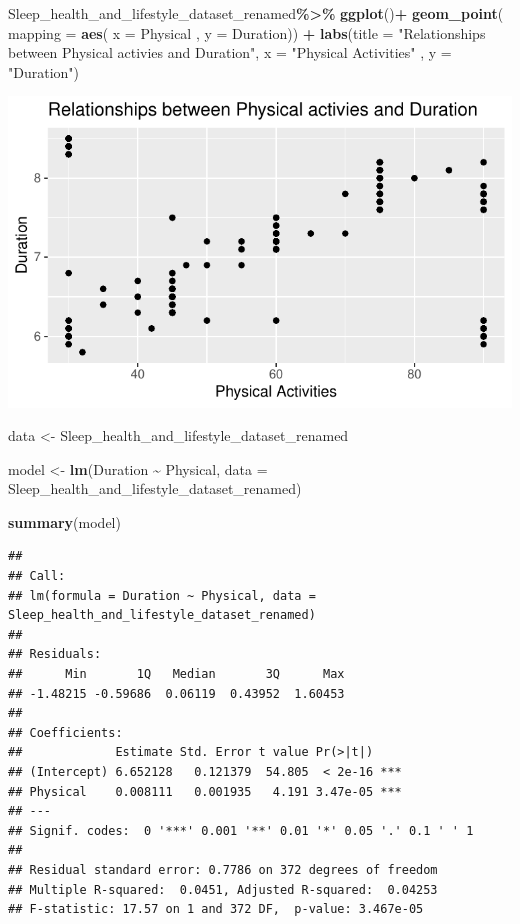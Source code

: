 \documentclass[
  11pt,
]{article}
\newenvironment{Shaded}{\begin{snugshade}}{\end{snugshade}}
\newcommand{\AttributeTok}[1]{\textcolor[rgb]{0.13,0.29,0.53}{#1}}
\newcommand{\FunctionTok}[1]{\textcolor[rgb]{0.13,0.29,0.53}{\textbf{#1}}}
\newcommand{\NormalTok}[1]{#1}
\newcommand{\OtherTok}[1]{\textcolor[rgb]{0.56,0.35,0.01}{#1}}
\newcommand{\SpecialCharTok}[1]{\textcolor[rgb]{0.81,0.36,0.00}{\textbf{#1}}}
\newcommand{\StringTok}[1]{\textcolor[rgb]{0.31,0.60,0.02}{#1}}
\begin{document}
\begin{Shaded}
\begin{Highlighting}[]
\NormalTok{Sleep\_health\_and\_lifestyle\_dataset\_renamed}\SpecialCharTok{\%\textgreater{}\%}
  \FunctionTok{ggplot}\NormalTok{()}\SpecialCharTok{+}
  \FunctionTok{geom\_point}\NormalTok{( }\AttributeTok{mapping =} \FunctionTok{aes}\NormalTok{( }\AttributeTok{x  =}\NormalTok{ Physical , }\AttributeTok{y =}\NormalTok{ Duration)) }\SpecialCharTok{+}
  \FunctionTok{labs}\NormalTok{(}\AttributeTok{title =} \StringTok{"Relationships between Physical activies and Duration"}\NormalTok{,}
       \AttributeTok{x =} \StringTok{"Physical Activities"}\NormalTok{ , }\AttributeTok{y =} \StringTok{"Duration"}\NormalTok{)}
\end{Highlighting}
\end{Shaded}

\begin{center}\includegraphics[width=0.7\linewidth]{SleepHelath_files/figure-latex/unnamed-chunk-46-1} \end{center}

\begin{Shaded}
\begin{Highlighting}[]
\NormalTok{data }\OtherTok{\textless{}{-}}\NormalTok{ Sleep\_health\_and\_lifestyle\_dataset\_renamed}

\NormalTok{model }\OtherTok{\textless{}{-}} \FunctionTok{lm}\NormalTok{(Duration }\SpecialCharTok{\textasciitilde{}}\NormalTok{ Physical, }\AttributeTok{data =}\NormalTok{ Sleep\_health\_and\_lifestyle\_dataset\_renamed)}


\FunctionTok{summary}\NormalTok{(model)}
\end{Highlighting}
\end{Shaded}

\begin{verbatim}
## 
## Call:
## lm(formula = Duration ~ Physical, data = Sleep_health_and_lifestyle_dataset_renamed)
## 
## Residuals:
##      Min       1Q   Median       3Q      Max 
## -1.48215 -0.59686  0.06119  0.43952  1.60453 
## 
## Coefficients:
##             Estimate Std. Error t value Pr(>|t|)    
## (Intercept) 6.652128   0.121379  54.805  < 2e-16 ***
## Physical    0.008111   0.001935   4.191 3.47e-05 ***
## ---
## Signif. codes:  0 '***' 0.001 '**' 0.01 '*' 0.05 '.' 0.1 ' ' 1
## 
## Residual standard error: 0.7786 on 372 degrees of freedom
## Multiple R-squared:  0.0451, Adjusted R-squared:  0.04253 
## F-statistic: 17.57 on 1 and 372 DF,  p-value: 3.467e-05
\end{verbatim}
\end{document}
